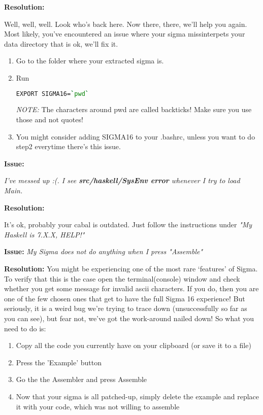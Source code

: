 \documentclass[11pt,a4paper]{article}
\begin{document}
 \textbf{Resolution:}
 
        Well, well, well. Look who's back here. Now there, there, we'll help you again. Most likely, you've encountered an issue where your sigma missinterpets your data directory that is ok, we'll fix it.
        \begin{enumerate}
             
        
        \item Go to the folder where your extracted sigma is.
        \item Run
\begin{lstlisting}[language=Bash]
EXPORT SIGMA16=`pwd`
\end{lstlisting}
        
        \textit{NOTE:} The characters around pwd are called backticks! Make sure you use those and not quotes!
	\item You might consider adding SIGMA16 to your .bashrc, unless you want to do step2 everytime there's this issue.
    \end{enumerate}

 \textbf{Issue:} 
 
 \textit{I've messed up :(. I see \textbf{src/haskell/SysEnv error} whenever I try to load Main.}
 
 \textbf{Resolution:}
 
        It's ok, probably your cabal is outdated. Just follow the instructions under \textit{"My Haskell is 7.X.X, HELP!"}

\textbf{Issue:}
 \textit{My Sigma does not do anything when I press "Assemble"}
 
\textbf{Resolution:}
 You might be experiencing one of the most rare `features' of Sigma. To verify that this is the case open the terminal(console) window and check whether you get some message for invalid ascii characters. If you do, then you are one of the few chosen ones that get to have the full Sigma 16 experience! But seriously, it is a weird bug we're trying to trace down (unsuccessfully so far as you can see), but fear not, we've got the work-around nailed down! So what you need to do is:
 \begin{enumerate}
     \item Copy all the code you currently have on your clipboard (or save it to a file)
     \item Press the 'Example' button
     \item Go the the Assembler and press Assemble
     \item Now that your sigma is all patched-up, simply delete the example and replace it with your code, which was not willing to assemble
 \end{enumerate}
\end{document}

